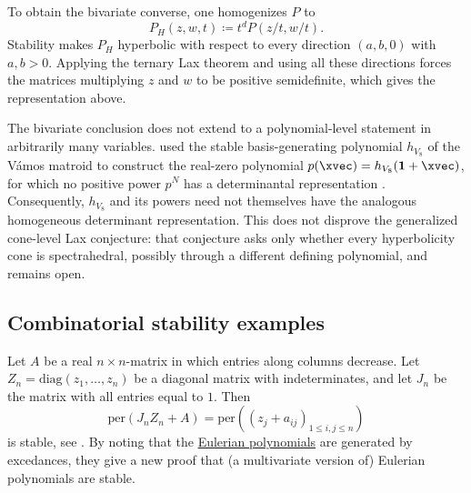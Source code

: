 To obtain the bivariate converse, one homogenizes $P$ to
\[
 P_H(z,w,t)\coloneqq t^dP(z/t,w/t).
\]
Stability makes $P_H$ hyperbolic with respect to every direction
$(a,b,0)$ with $a,b>0$.  Applying the ternary Lax theorem and using all these
directions forces the matrices multiplying $z$ and $w$ to be positive
semidefinite, which gives the representation above.

The bivariate conclusion does not extend to a polynomial-level statement in
arbitrarily many variables.   used the stable
basis-generating polynomial $h_{V_8}$ of the Vámos matroid to construct the
real-zero polynomial $p(\xvec)=h_{V_8}(\mathbf{1}+\xvec)$, for which no
positive power $p^N$ has a determinantal representation
\cite[Thm.~3.3]{Branden2011}.  Consequently, $h_{V_8}$ and its powers need not
themselves have the analogous homogeneous determinant representation.  This
does not disprove the generalized cone-level Lax conjecture: that conjecture
asks only whether every hyperbolicity cone is spectrahedral, possibly through
a different defining polynomial, and remains open.


\subsection[combinatorialStablePolynomialExamples]{Combinatorial stability examples}

\begin{example*}

Let $A$ be a real $n\times n$-matrix in which entries along columns decrease.
Let $Z_n = \mathrm{diag}(z_1,\dotsc,z_n)$ be a diagonal matrix with indeterminates,
and let $J_n$ be the matrix with all entries equal to $1$.
Then
\[
 \mathrm{per}(J_nZ_n + A) = \mathrm{per}\left( (z_j + a_{ij})_{1 \leq i,j \leq n} \right)
\]
is stable, see \cite{BrandenHaglundVisontaiWagner2011}.
By noting that the \hyperref[eulerianPolynomial]{Eulerian polynomials}
are generated by excedances,
they give a new proof that (a multivariate version of) Eulerian polynomials
are stable.
\end{example*}


